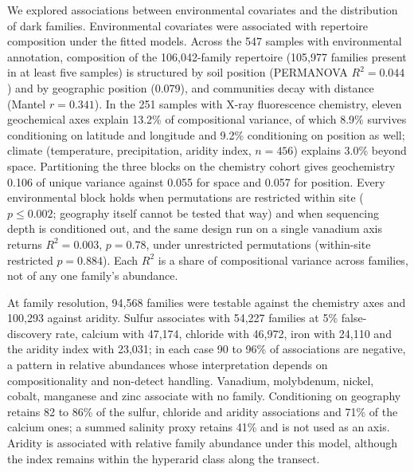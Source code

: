 \documentclass[11pt]{article}
\begin{document}
We explored associations between environmental covariates and the distribution of dark families. Environmental covariates were associated with repertoire composition under the fitted models. Across the 547
samples with environmental annotation, composition of the 106{,}042-family repertoire (105{,}977
families present in at least five samples) is structured by soil position (PERMANOVA $R^2 = 0.044$)
and by geographic position (0.079), and communities decay with distance (Mantel $r = 0.341$). In the
251 samples with X-ray fluorescence chemistry, eleven geochemical axes explain 13.2\% of
compositional variance, of which 8.9\% survives conditioning on latitude and longitude and 9.2\%
conditioning on position as well; climate (temperature, precipitation, aridity index, $n = 456$)
explains 3.0\% beyond space. Partitioning the three blocks on the
chemistry cohort gives geochemistry 0.106 of unique variance against 0.055 for space and 0.057 for
position. Every environmental block holds when permutations are restricted within site
($p \leq 0.002$; geography itself cannot be tested that way) and when sequencing depth is conditioned
out, and the same design run on a single vanadium axis returns $R^2 = 0.003$, $p = 0.78$, under unrestricted permutations (within-site restricted $p = 0.884$). Each $R^2$ is a share of
compositional variance across families, not of any one family's abundance.

At family resolution, 94{,}568 families were testable against the chemistry axes and 100{,}293
against aridity. Sulfur associates with 54{,}227 families at 5\% false-discovery rate, calcium
with 47{,}174, chloride with 46{,}972, iron with 24{,}110 and the aridity index with 23{,}031; in
each case 90 to 96\% of associations are negative, a pattern in relative abundances whose interpretation depends on compositionality and non-detect handling. Vanadium, molybdenum, nickel, cobalt,
manganese and zinc associate with no family. Conditioning on geography retains 82 to 86\% of the
sulfur, chloride and aridity associations and 71\% of the calcium ones; a summed salinity proxy
retains 41\% and is not used as an axis. Aridity is associated with relative family abundance under this model, although the index remains within the hyperarid class along the transect.
\end{document}
